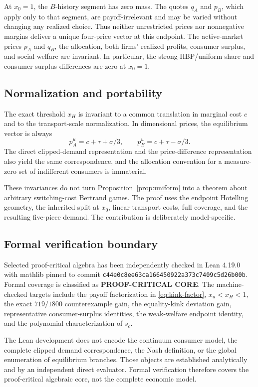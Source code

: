 At \(x_0=1\), the \(B\)-history segment has zero mass. The quotes \(q_A\) and \(p_B\), which apply only to that segment, are payoff-irrelevant and may be varied without changing any realized choice. Thus neither unrestricted prices nor nonnegative margins deliver a unique four-price vector at this endpoint. The active-market prices \(p_A\) and \(q_B\), the allocation, both firms' realized profits, consumer surplus, and social welfare are invariant. In particular, the strong-HBP/uniform share and consumer-surplus differences are zero at \(x_0=1\).

\subsection{Normalization and portability}

The exact threshold \(x_H\) is invariant to a common translation in marginal cost \(c\) and to the transport-scale normalization. In dimensional prices, the equilibrium vector is always
\[
p_A^u=c+\tau+\sigma/3,
\qquad
p_B^u=c+\tau-\sigma/3.
\]
The direct clipped-demand representation and the price-difference representation also yield the same correspondence, and the allocation convention for a measure-zero set of indifferent consumers is immaterial.

These invariances do not turn Proposition~\ref{prop:uniform} into a theorem about arbitrary switching-cost Bertrand games. The proof uses the endpoint Hotelling geometry, the inherited split at \(x_0\), linear transport costs, full coverage, and the resulting five-piece demand. The contribution is deliberately model-specific.

\subsection{Formal verification boundary}

Selected proof-critical algebra has been independently checked in Lean 4.19.0 with mathlib pinned to commit
\texttt{c44e0c8ee63ca166450922a373c7409c5d26b00b}.
Formal coverage is classified as \textbf{PROOF-CRITICAL CORE}. The machine-checked targets include the payoff factorization in \eqref{eq:kink-factor}, \(x_u<x_H<1\), the exact \(719/1800\) counterexample gain, the equality-kink deviation gain, representative consumer-surplus identities, the weak-welfare endpoint identity, and the polynomial characterization of \(s_c\).

The Lean development does not encode the continuum consumer model, the complete clipped demand correspondence, the Nash definition, or the global enumeration of equilibrium branches. Those objects are established analytically and by an independent direct evaluator. Formal verification therefore covers the proof-critical algebraic core, not the complete economic model.

